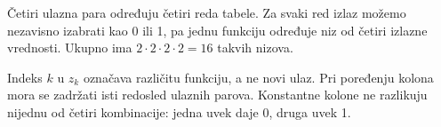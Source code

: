 
Četiri ulazna para određuju četiri reda tabele. Za svaki red izlaz možemo nezavisno izabrati kao 0 ili 1, pa jednu funkciju određuje niz od četiri izlazne vrednosti. Ukupno ima \(2\cdot2\cdot2\cdot2=16\) takvih nizova.

Indeks \(k\) u \(z_k\) označava različitu funkciju, a ne novi ulaz. Pri poređenju kolona mora se zadržati isti redosled ulaznih parova. Konstantne kolone ne razlikuju nijednu od četiri kombinacije: jedna uvek daje 0, druga uvek 1.
